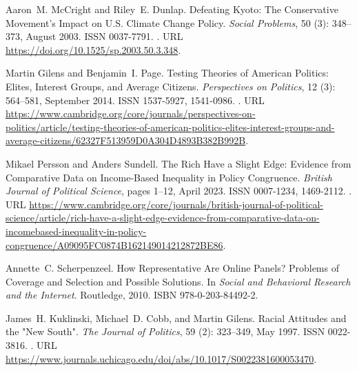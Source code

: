 \documentclass[12pt,english]{article}
\begin{document}
\begin{thebibliography}{55}
  Aaron~M. McCright and Riley~E. Dunlap.
  \newblock Defeating {{Kyoto}}: {{The Conservative Movement}}'s {{Impact}} on
    {{U}}.{{S}}. {{Climate Change Policy}}.
  \newblock \emph{Social Problems}, 50 (3): 348--373, August
    2003.
  \newblock ISSN 0037-7791.
  \newblock {}.
  \newblock URL \url{https://doi.org/10.1525/sp.2003.50.3.348}.
  
  Martin Gilens and Benjamin~I. Page.
  \newblock Testing {{Theories}} of {{American Politics}}: {{Elites}}, {{Interest
    Groups}}, and {{Average Citizens}}.
  \newblock \emph{Perspectives on Politics}, 12 (3): 564--581,
    September 2014.
  \newblock ISSN 1537-5927, 1541-0986.
  \newblock {}.
  \newblock URL
    \url{https://www.cambridge.org/core/journals/perspectives-on-politics/article/testing-theories-of-american-politics-elites-interest-groups-and-average-citizens/62327F513959D0A304D4893B382B992B}.
  
  Mikael Persson and Anders Sundell.
  \newblock The {{Rich Have}} a {{Slight Edge}}: {{Evidence}} from {{Comparative
    Data}} on {{Income-Based Inequality}} in {{Policy Congruence}}.
  \newblock \emph{British Journal of Political Science}, pages 1--12, April 2023.
  \newblock ISSN 0007-1234, 1469-2112.
  \newblock {}.
  \newblock URL
    \url{https://www.cambridge.org/core/journals/british-journal-of-political-science/article/rich-have-a-slight-edge-evidence-from-comparative-data-on-incomebased-inequality-in-policy-congruence/A09095FC0874B162149014212872BE86}.
  
  Annette~C. Scherpenzeel.
  \newblock How {{Representative Are Online Panels}}? {{Problems}} of
    {{Coverage}} and {{Selection}} and {{Possible Solutions}}.
  \newblock In \emph{Social and {{Behavioral Research}} and the {{Internet}}}.
    Routledge, 2010.
  \newblock ISBN 978-0-203-84492-2.
  
  James~H. Kuklinski, Michael~D. Cobb, and Martin Gilens.
  \newblock Racial {{Attitudes}} and the "{{New South}}".
  \newblock \emph{The Journal of Politics}, 59 (2): 323--349,
    May 1997.
  \newblock ISSN 0022-3816.
  \newblock {}.
  \newblock URL
    \url{https://www.journals.uchicago.edu/doi/abs/10.1017/S0022381600053470}.
  

\end{thebibliography}
\end{document}
